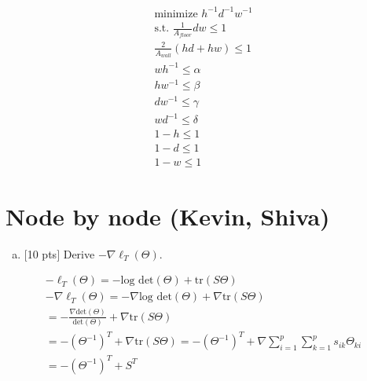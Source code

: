 \documentclass[12pt]{article}
\begin{document}
\begin{align*}
\text{minimize } h^{-1}d^{-1}w^{-1} \\
\text{s.t. } \frac{1}{A_{floor}}dw \leq 1 \\
\frac{2}{A_{wall}}(hd+hw)  \leq 1 \\
wh^{-1} \leq \alpha \\
hw^{-1} \leq \beta \\
dw^{-1} \leq \gamma \\
wd^{-1} \leq \delta \\
1-h \leq 1 \\
1-d \leq 1 \\
1-w \leq 1
\end{align*}
\vspace{.25cm}


\newpage
\clearpage


\section{Node by node (Kevin, Shiva)}


\begin{enumerate}[(a)]
\item $[$10 pts$]$ Derive $-\nabla\ell_T(\Theta)$.
\end{enumerate}

\begin{align*}
-\ell_T(\Theta) = -\textrm{log det}(\Theta) + \textrm{tr}(S\Theta) \\
-\nabla\ell_T(\Theta) = -\nabla \textrm{log det}(\Theta) + \nabla \textrm{tr}(S\Theta) \\
 = -\frac{\nabla \textrm{det}(\Theta)}{\textrm{det}(\Theta)} + \nabla \textrm{tr}(S\Theta)  \\
 = -(\Theta^{-1})^{T} + \nabla \textrm{tr}(S\Theta) 
 = -(\Theta^{-1})^{T} + \nabla \sum_{i=1}^{p} \sum_{k=1}^{p} {s_{ik}\Theta_{ki}} \\
 = -(\Theta^{-1})^{T} + S^T
\end{align*}
\end{document}
